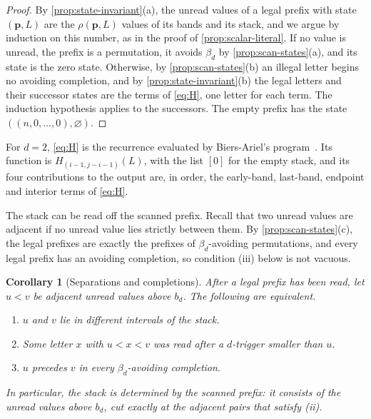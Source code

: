 \documentclass[11pt,reqno]{amsart}
\newtheorem{corollary}[corollary]{Corollary}
\theoremstyle{definition}
\theoremstyle{remark}
\begin{document}
\begin{proof}
By \cref{prop:state-invariant}(a), the unread values of a legal prefix with
state $(\mathbf p,L)$ are the $\rho(\mathbf p,L)$ values of its bands and
its stack, and we argue by induction on this number, as in the proof of
\cref{prop:scalar-literal}.  If no value is unread, the prefix is a
permutation, it avoids $\beta_d$ by \cref{prop:scan-states}(a), and its
state is the zero state.  Otherwise, by \cref{prop:scan-states}(b) an
illegal letter begins no avoiding completion, and by
\cref{prop:state-invariant}(b) the legal letters and their successor states
are the terms of \eqref{eq:H}, one letter for each term.  The induction
hypothesis applies to the successors.  The empty prefix has the state
$((n,0,\ldots,0),\varnothing)$.
\end{proof}

For $d=2$, \eqref{eq:H} is the recurrence evaluated by Biers-Ariel's
program~\cite{BiersArielA116485}.  Its function
 is $H_{(i-1,j-i-1)}(L)$, with the list
$[0]$ for the empty stack, and its four contributions to the output are, in
order, the early-band, last-band, endpoint and interior terms of
\eqref{eq:H}.

The stack can be read off the scanned prefix.  Recall that two unread
values are adjacent if no unread value lies strictly between them.  By
\cref{prop:scan-states}(c), the legal prefixes are exactly the prefixes of
$\beta_d$-avoiding permutations, and every legal prefix has an avoiding
completion, so condition (iii) below is not vacuous.

\begin{corollary}[Separations and completions]\label{cor:separators}
After a legal prefix has been read, let $u<v$ be adjacent unread values
above $b_d$.  The following are equivalent.
\begin{enumerate}
\item[(i)] $u$ and $v$ lie in different intervals of the stack.
\item[(ii)] Some letter $x$ with $u<x<v$ was read after a $d$-trigger
  smaller than $u$.
\item[(iii)] $u$ precedes $v$ in every $\beta_d$-avoiding completion.
\end{enumerate}
In particular, the stack is determined by the scanned prefix: it consists
of the unread values above $b_d$, cut exactly at the adjacent pairs that
satisfy (ii).
\end{corollary}
\end{document}
